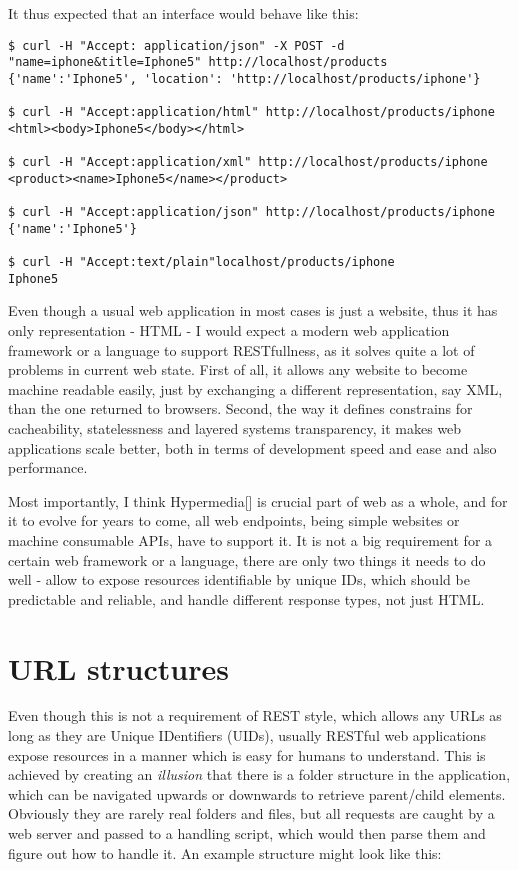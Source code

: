 It thus expected that an interface would behave like this:

\begin{codelisting}
\begin{verbatim}
$ curl -H "Accept: application/json" -X POST -d "name=iphone&title=Iphone5" http://localhost/products
{'name':'Iphone5', 'location': 'http://localhost/products/iphone'}

$ curl -H "Accept:application/html" http://localhost/products/iphone
<html><body>Iphone5</body></html>

$ curl -H "Accept:application/xml" http://localhost/products/iphone
<product><name>Iphone5</name></product>

$ curl -H "Accept:application/json" http://localhost/products/iphone
{'name':'Iphone5'}

$ curl -H "Accept:text/plain"localhost/products/iphone
Iphone5
\end{verbatim}
\end{codelisting}

Even though a usual web application in most cases is just a website, thus it has only representation - HTML - I would expect a modern web application framework or a language to support RESTfullness, as it solves quite a lot of problems in current web state. First of all, it allows any website to become machine readable easily, just by exchanging a different representation, say XML, than the one returned to browsers. Second, the way it defines constrains for cacheability, statelessness and layered systems transparency, it makes web applications scale better, both in terms of development speed and ease and also performance. 

Most importantly, I think Hypermedia[] is crucial part of web as a whole, and for it to evolve for years to come, all web endpoints, being simple websites or machine consumable APIs, have to support it. It is not a big requirement for a certain web framework or a language, there are only two things it needs to do well - allow to expose resources identifiable by unique IDs, which should be predictable and reliable, and handle different response types, not just HTML. 

\section{URL structures}

Even though this is not a requirement of REST style, which allows any URLs as long as they are Unique IDentifiers (UIDs), usually RESTful web applications expose resources in a manner which is easy for humans to understand. This is achieved by creating an \textit{illusion} that there is a folder structure in the application, which can be navigated upwards or downwards to retrieve parent/child elements. Obviously they are rarely real folders and files, but all requests are caught by a web server and passed to a handling script, which would then parse them and figure out how to handle it. An example structure might look like this:

